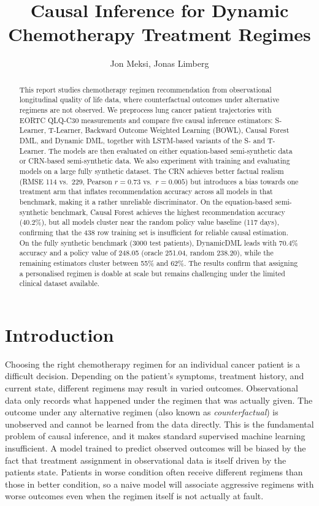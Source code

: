 \documentclass{article}
\title{Causal Inference for Dynamic Chemotherapy Treatment
Regimes}
\author{Jon Meksi, Jonas Limberg}
\begin{document}
\maketitle

\begin{abstract}
\noindent
This report studies chemotherapy regimen recommendation from observational longitudinal quality of life data, where counterfactual outcomes under alternative regimens are not observed. We preprocess lung cancer patient trajectories with EORTC QLQ-C30 measurements and compare five causal inference estimators: S-Learner, T-Learner, Backward Outcome Weighted Learning (BOWL), Causal Forest DML, and Dynamic DML, together with LSTM-based variants of the S- and T-Learner. The models are then evaluated on either equation-based semi-synthetic data or CRN-based semi-synthetic data. We also experiment with training and evaluating models on a large fully synthetic dataset. The CRN achieves better factual realism (RMSE 114 vs.\ 229, Pearson $r = 0.73$ vs.\ $r = 0.005$) but introduces a bias towards one treatment arm that inflates recommendation accuracy across all models in that benchmark, making it a rather unreliable discriminator. On the equation-based semi-synthetic benchmark, Causal Forest achieves the highest recommendation accuracy (40.2\%), but all models cluster near the random policy value baseline (117 days), confirming that the 438 row training set is insufficient for reliable causal estimation. On the fully synthetic benchmark (3000 test patients), DynamicDML leads with 70.4\% accuracy and a policy value of 248.05 (oracle 251.04, random 238.20), while the remaining estimators cluster between 55\% and 62\%. The results confirm that assigning a personalised regimen is doable at scale but remains challenging under the limited clinical dataset available.
\end{abstract}
\newpage

\tableofcontents
\newpage
\section{Introduction}
Choosing the right chemotherapy regimen for an individual cancer
patient is a difficult decision.  Depending on the patient's symptoms, treatment history, and current state, different regimens may result in varied outcomes. Observational data only records what happened under the regimen that was actually given.
The outcome under any alternative regimen (also known as \emph{counterfactual}) is unobserved and cannot be learned from the data
directly. This is the fundamental problem of causal inference, and
it makes standard supervised machine learning insufficient.
A model trained to predict observed outcomes will be biased by the fact that
treatment assignment in observational data is itself driven by the patients
state. Patients in worse condition often receive different regimens than
those in better condition, so a naive model will associate aggressive regimens with worse outcomes even when the regimen itself is not actually at fault.
\end{document}
